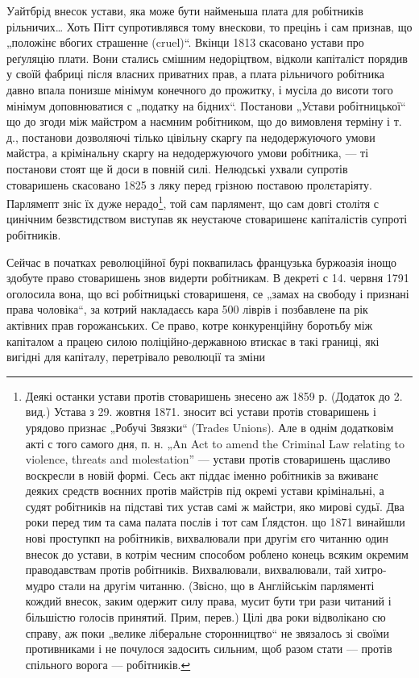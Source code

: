 \parcont{}
Уайтбрід внесок устави, яка може бути найменьша плата
для робітників рільничих\dots{} Хоть Пітт супротивлявся тому
внескови, то прецінь і сам признав, що „положінє вбогих
страшенне (cruel)“. Вкінци 1813 скасовано устави про реґуляцію
плати. Вони стались смішним недоріцтвом, відколи
капіталіст порядив у своїй фабриці після власних приватних
прав, а плата рільничого робітника давно впала понизше
мінімум конечного до прожитку, і мусіла до висоти
того мінімум доповнюватися с „податку на бідних“. Постанови
„Устави робітницької“ що до згоди між майстром
а наємним робітником, що до вимовленя терміну і т. д.,
постанови дозволяючі тілько цівільну скаргу па недодержуючого
умови майстра, а крімінальну скаргу на недодержуючого
умови робітника, — ті постанови стоят ще й доси
в повній силі. Нелюдські ухвали супротів стоваришень
скасовано 1825 з ляку перед грізною поставою пролєтаріяту.
Парлямепт зніс їх дуже нерадо\footnote{
Деякі останки устави протів стоваришень знесено аж 1859 р.
(Додаток до 2. вид.) Устава з 29. жовтня 1871. зносит всі устави
протів стоваришень і урядово признає „Робучі Звязки“ (Trades Unions).
Але в однім додатковім акті с того самого дня, п. н. „An Act to amend
the Criminal Law relating to violence, threats and molestation” — устави
протів стоваришень щасливо воскресли в новій формі. Сесь акт піддає
іменно робітників за вживанє деяких средств воєнних протів майстрів
під окремі устави крімінальні, а судят робітників на підставі тих устав
самі ж майстри, яко мирові судьї. Два роки перед тим та сама палата
послів і тот сам Ґлядстон. що 1871 винайшли нові проступкп на робітників,
вихвалювали при другім єго читанню один внесок до устави, в котрім
чесним способом роблено конець всяким окремим праводавствам
протів робітників. Вихвалювали, вихвалювали, тай хитро-мудро стали на
другім читанню. (Звісно, що в Англійськім парляменті кождий внесок,
заким одержит силу права, мусит бути три рази читаний і більшістю голосів
принятий. Прим, перев.) Цілі два роки відволікано сю справу, аж
поки „велике ліберальне сторонництво“ не звязалось зі своїми противниками
і не почулося задосить сильним, щоб разом стати — протів спільного
ворога — робітників.
},  той сам парлямент, що
сам довгі столітя с цинічним безвстидством виступав як
неустаюче стоваришенє капіталістів супроті робітників.

Сейчас в початках революційної бурі поквапилась французька
буржоазія інощо здобуте право стоваришень знов
видерти робітникам. В декреті с 14. червня 1791 оголосила
вона, що всі робітницькі стоваришеня, се „замах на свободу
і признані права чоловіка“, за котрий накладаєсь кара
500 ліврів і позбавлене па рік актівних прав горожанських.
Се право, котре конкуренційну боротьбу між капіталом
а працею силою поліційно-державною втискає в такі границі,
які вигідні для капіталу, перетрівало революції та зміни
\parbreak{}
